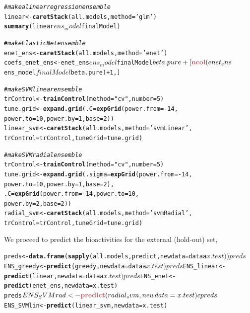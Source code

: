 \documentclass[twoside,a4wide,12pt]{article}\usepackage[]{graphicx}\usepackage[]{color}
\makeatletter
\newcommand{\hlstr}[1]{\textcolor[rgb]{0.192,0.494,0.8}{#1}}%
\newcommand{\hlcom}[1]{\textcolor[rgb]{0.678,0.584,0.686}{\textit{#1}}}%
\newcommand{\hlkwd}[1]{\textcolor[rgb]{0.737,0.353,0.396}{\textbf{#1}}}%
\newenvironment{kframe}{%
 \def\at@end@of@kframe{}%
 \ifinner\ifhmode%
  \def\at@end@of@kframe{\end{minipage}}%
  \begin{minipage}{\columnwidth}%
 \fi\fi%
 \def\FrameCommand##1{\hskip\@totalleftmargin \hskip-\fboxsep
 \colorbox{shadecolor}{##1}\hskip-\fboxsep
     \hskip-\linewidth \hskip-\@totalleftmargin \hskip\columnwidth}%
 \MakeFramed {\advance\hsize-\width
   \@totalleftmargin\z@ \linewidth\hsize
   \@setminipage}}%
 {\par\unskip\endMakeFramed%
 \at@end@of@kframe}
\newenvironment{knitrout}{}{} %
\makeatother
\begin{document}
\begin{knitrout}
\color{fgcolor}\begin{kframe}
\begin{alltt}
\hlcom{  # make a linear regression ensemble}
  linear <- \hlkwd{caretStack}(all.models, method=\hlstr{'glm'})
\hlkwd{summary}(linear$ens_model$finalModel)

\hlcom{# make Elastic Net ensemble}
enet_ens <- \hlkwd{caretStack}(all.models, method=\hlstr{'enet'})
coefs_enet_ens <- enet_ens$ens_model$finalModel$beta.pure +
[\hlkwd{ncol}(enet_ens$ens_model$finalModel$beta.pure)+1,]

\hlcom{# make SVM linear ensemble}
trControl <- \hlkwd{trainControl}(method = \hlstr{"cv"},  number=5)
tune.grid <- \hlkwd{expand.grid}(.C=\hlkwd{expGrid}(power.from=-14,
                                    power.to=10,power.by=1,base=2))
linear_svm <- \hlkwd{caretStack}(all.models, method=\hlstr{'svmLinear'},
                         trControl=trControl,tuneGrid=tune.grid)

\hlcom{# make SVM radial ensemble}
trControl <- \hlkwd{trainControl}(method = \hlstr{"cv"},  number=5)
tune.grid <- \hlkwd{expand.grid}(.sigma=\hlkwd{expGrid}(power.from=-14,
                                        power.to=10,power.by=1,base=2),
                         .C=\hlkwd{expGrid}(power.from=-14,power.to=10,
                                    power.by=2,base=2))
radial_svm <- \hlkwd{caretStack}(all.models, method=\hlstr{'svmRadial'},
                         trControl=trControl,tuneGrid=tune.grid)
\end{alltt}
\end{kframe}
\end{knitrout}

We proceed to predict the bioactivities for the external (hold-out) set,
\begin{knitrout}
\color{fgcolor}\begin{kframe}
\begin{alltt}
preds <- \hlkwd{data.frame}(\hlkwd{sapply}(all.models, predict, newdata=dataa$x.test))
preds$ENS_greedy <- \hlkwd{predict}(greedy, newdata=dataa$x.test)
preds$ENS_linear <- \hlkwd{predict}(linear, newdata=dataa$x.test)
preds$ENS_enet <- \hlkwd{predict}(enet_ens, newdata=x.test)
preds$ENS_SVMrad <- \hlkwd{predict}(radial_svm, newdata=x.test)c
preds$ENS_SVMlin <- \hlkwd{predict}(linear_svm, newdata=x.test)
\end{alltt}
\end{kframe}
\end{knitrout}
\end{document}
